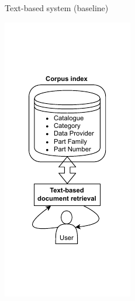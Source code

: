 \begin{frame}{Text-based system (baseline)}

        \vspace{-3em}
        \begin{center}
            \includegraphics[scale=1.2]{images/tp-expe-text-based-sys.pdf} 
        \end{center}

\end{frame}

